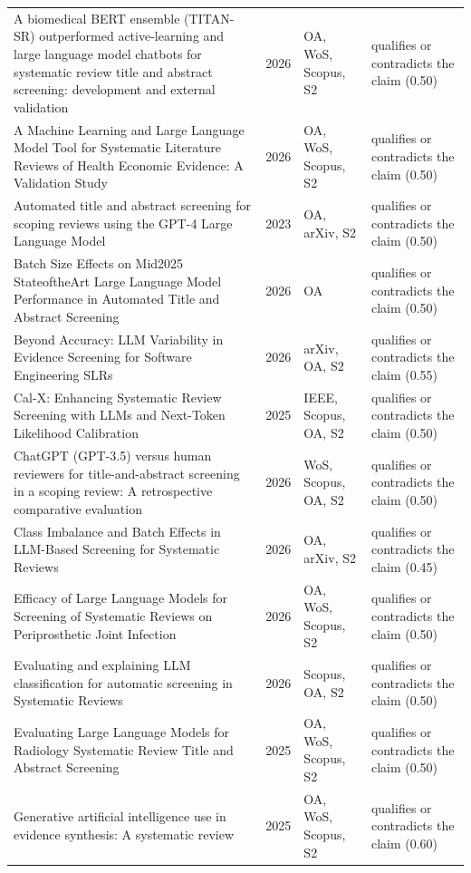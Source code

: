 \begin{longtable}{@{}%
  >{\raggedright\arraybackslash}p{}c%
  >{\raggedright\arraybackslash}p{}%
  >{\raggedright\arraybackslash}p{}@{}}
A biomedical BERT ensemble (TITAN-SR) outperformed active-learning and large language model chatbots for systematic review title and abstract screening: development and external validation & 2026 & OA, WoS, Scopus, S2 & qualifies or contradicts the claim (0.50) \\
A Machine Learning and Large Language Model Tool for Systematic Literature Reviews of Health Economic Evidence: A Validation Study & 2026 & OA, WoS, Scopus, S2 & qualifies or contradicts the claim (0.50) \\
Automated title and abstract screening for scoping reviews using the GPT-4 Large Language Model & 2023 & OA, arXiv, S2 & qualifies or contradicts the claim (0.50) \\
Batch Size Effects on Mid2025 StateoftheArt Large Language Model Performance in Automated Title and Abstract Screening & 2026 & OA & qualifies or contradicts the claim (0.50) \\
Beyond Accuracy: LLM Variability in Evidence Screening for Software Engineering SLRs & 2026 & arXiv, OA, S2 & qualifies or contradicts the claim (0.55) \\
Cal-X: Enhancing Systematic Review Screening with LLMs and Next-Token Likelihood Calibration & 2025 & IEEE, Scopus, OA, S2 & qualifies or contradicts the claim (0.50) \\
ChatGPT (GPT-3.5) versus human reviewers for title-and-abstract screening in a scoping review: A retrospective comparative evaluation & 2026 & WoS, Scopus, OA, S2 & qualifies or contradicts the claim (0.50) \\
Class Imbalance and Batch Effects in LLM-Based Screening for Systematic Reviews & 2026 & OA, arXiv, S2 & qualifies or contradicts the claim (0.45) \\
Efficacy of Large Language Models for Screening of Systematic Reviews on Periprosthetic Joint Infection & 2026 & OA, WoS, Scopus, S2 & qualifies or contradicts the claim (0.50) \\
Evaluating and explaining LLM classification for automatic screening in Systematic Reviews & 2026 & Scopus, OA, S2 & qualifies or contradicts the claim (0.50) \\
Evaluating Large Language Models for Radiology Systematic Review Title and Abstract Screening & 2025 & OA, WoS, Scopus, S2 & qualifies or contradicts the claim (0.50) \\
Generative artificial intelligence use in evidence synthesis: A systematic review & 2025 & OA, WoS, Scopus, S2 & qualifies or contradicts the claim (0.60) \\

\end{longtable}
